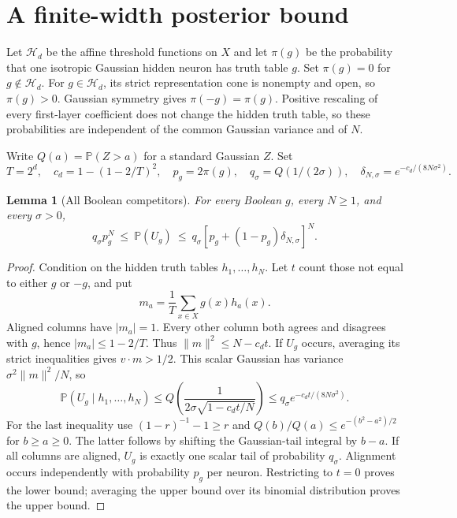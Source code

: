 \documentclass[11pt]{article}
\newtheorem{lemma}[theorem]{Lemma}
\newcommand{\Pp}{\mathbb P}
\newcommand{\cH}{\mathcal H}
\begin{document}
\section{A finite-width posterior bound}

Let $\cH_d$ be the affine threshold functions on $X$ and let
$\pi(g)$ be the probability that one isotropic Gaussian hidden neuron
has truth table $g$. Set $\pi(g)=0$ for $g\notin\cH_d$.
For $g\in\cH_d$, its strict representation cone is nonempty and open,
so $\pi(g)>0$. Gaussian symmetry gives $\pi(-g)=\pi(g)$.
Positive rescaling of every first-layer coefficient does not change
the hidden truth table, so these probabilities are independent of the
common Gaussian variance and of $N$.

Write $Q(a)=\Pp(Z>a)$ for a standard Gaussian $Z$. Set
\begin{equation}\label{eq:tailconstants}
 T=2^d,\quad c_d=1-(1-2/T)^2,\quad p_g=2\pi(g),\quad
 q_\sigma=Q(1/(2\sigma)),\quad
 \delta_{N,\sigma}=e^{-c_d/(8N\sigma^2)}.
\end{equation}

\begin{lemma}[All Boolean competitors]\label{lem:posterior}
For every Boolean $g$, every $N\ge1$, and every $\sigma>0$,
\begin{equation}\label{eq:massbounds}
 q_\sigma p_g^N\ \le\ \Pp(U_g)\ \le\
 q_\sigma[p_g+(1-p_g)\delta_{N,\sigma}]^N.
\end{equation}
\end{lemma}
\begin{proof}
Condition on the hidden truth tables $h_1,\ldots,h_N$. Let $t$ count
those not equal to either $g$ or $-g$, and put
\[
 m_a=\frac1T\sum_{x\in X}g(x)h_a(x).
\]
Aligned columns have $|m_a|=1$. Every other column both agrees and
disagrees with $g$, hence $|m_a|\le1-2/T$. Thus
$\|m\|^2\le N-c_dt$. If $U_g$ occurs, averaging its strict inequalities
gives $v\cdot m>1/2$. This scalar Gaussian has variance
$\sigma^2\|m\|^2/N$, so
\[
 \Pp(U_g\mid h_1,\ldots,h_N)
 \le Q\!\left(\frac1{2\sigma\sqrt{1-c_dt/N}}\right)
 \le q_\sigma e^{-c_dt/(8N\sigma^2)}.
\]
For the last inequality use $(1-r)^{-1}-1\ge r$ and
$Q(b)/Q(a)\le e^{-(b^2-a^2)/2}$ for $b\ge a\ge0$.
The latter follows by shifting the Gaussian-tail integral by $b-a$.
If all columns are aligned, $U_g$ is exactly one scalar tail of
probability $q_\sigma$. Alignment occurs independently with probability
$p_g$ per neuron. Restricting to $t=0$ proves the lower bound; averaging
the upper bound over its binomial distribution proves the upper bound.
\end{proof}
\end{document}
